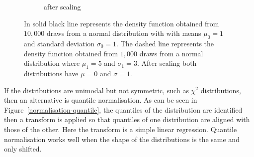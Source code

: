 \begin{figure}[ht]
\begin{subfigure}[b]{.5\textwidth}
\caption{after scaling}
\end{subfigure}
\caption{ \label{normalisation-scaled}
In solid black line represents the density function obtained from $10,000$ draws from a normal distribution
with with means $\mu_0=1$ and standard deviation $\sigma_0=1$.
The dashed line represents the density function obtained from $1,000$ draws from a normal distribution
where $\mu_1=5$ and $\sigma_1=3$.
After scaling both distributions have $\mu=0$ and $\sigma=1$.
}
\end{figure}


If the distributions are unimodal but not symmetric, such as $\chi^2$ distributions, then an alternative is quantile normalisation.
As can be seen in Figure~\ref{normalisation-quantile}, the quantiles of the distribution are identified
then a transform is applied so that quantiles of one distribution are aligned with those of the other.
Here the transform is a simple linear regression.
Quantile normalisation works well when the shape of the distributions is the same and only shifted.

